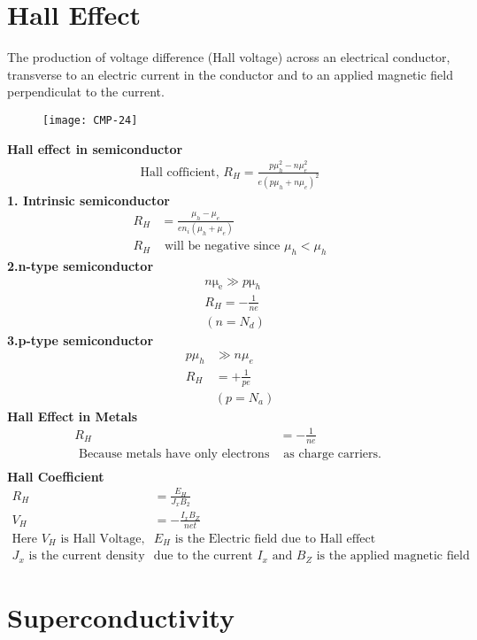 \section{Hall Effect}
The production of voltage difference (Hall voltage) across an electrical conductor, transverse to an electric current in the conductor and to an applied magnetic field perpendiculat to the current.
\begin{figure}[H]
	\centering
	\texttt{[image: CMP-24]}
	\caption{}
	\label{}
\end{figure}
\textbf{Hall effect in semiconductor}
\begin{align*}
\text{Hall cofficient, } R_{H}=\frac{p \mu_{h}^{2}-n \mu_{e}^{2}}{e\left(p \mu_{h}+n \mu_{e}\right)^{2}}
\end{align*}
\textbf{1. Intrinsic semiconductor}
\begin{align*}
R_{H}&=\frac{\mu_{h}-\mu_{e}}{e n_{i}\left(\mu_{h}+\mu_{e}\right)}\\
R_{H} &\text{ will be negative since } \mu_{h} < \mu_{h}
\end{align*}
\textbf{2.n-type semiconductor}
\begin{align*}
&n \mathrm{\mu_e} \gg p \mathrm{\mu}_{h}\\
&R_{H}=-\frac{1}{ne}\\
&\left(n=N_{d}\right)
\end{align*}
\textbf{3.p-type semiconductor}
\begin{align*}
p \mu_{h} &\gg n \mu_{e}\\
R_{H}&=+\frac{1}{p e}\\
&(p=N_a)
\end{align*}
\textbf{Hall Effect in Metals}
\begin{align*}
R_{H}&=-\frac{1}{n e}\\
\text { Because metals have only  electrons} &\text { as charge carriers. }\\
\end{align*}
\textbf{Hall Coefficient}
\begin{align*}
R_{H}&=\frac{E_{H}}{J_{x} B_{2}}\\
V_{H}&=-\frac{I_{x} B_{Z}}{n e t}\\
\text{Here $V_{H}$ is Hall Voltage, }&\text{$E_{H}$ is the Electric field due to Hall effect}
\\ \text{$J_{x}$ is the current density }&\text{due to the current $I_{x}$ and $B_{Z}$ is the applied magnetic field}
\end{align*}
\section{Superconductivity}
